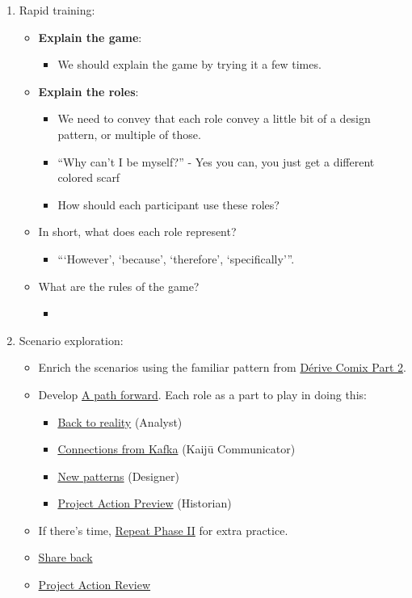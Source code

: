 \documentclass{article}
\begin{document}
\begin{enumerate}
\item Rapid training:

\begin{itemize}
\item \textbf{Explain the game}:
\begin{itemize}
\item We should explain the game by trying it a few times.
\end{itemize}
\item \textbf{Explain the roles}:
\begin{itemize}
\item We need to convey that each role convey a little bit of a design pattern, or multiple of those.
\item “Why can’t I be myself?” - Yes you can, you just get a different colored scarf
\item How should each participant use these roles?
\end{itemize}
\item In short, what does each role represent?
\begin{itemize}
\item ``‘However’, ‘because’, ‘therefore’, ‘specifically’''.
\end{itemize}
\item What are the rules of the game?
\begin{itemize}
\item{}
\end{itemize}
\end{itemize}

\item Scenario exploration:

\begin{itemize}
\item Enrich the scenarios using the familiar pattern from \hyperref[f447153f-7ff5-449d-bb08-67f579dda53f]{Dérive Comix Part 2}.
\item Develop \hyperref[7c0dce3b-d5ea-4712-a771-6ff26f143686]{A path forward}.  Each role as a part to play in doing this:
\begin{itemize}
\item \hyperref[e38d2006-bcf7-494b-bd51-d8932b1ed0cd]{Back to reality} (Analyst)
\item \hyperref[34be214c-5885-4794-b93c-84e49ddad18b]{Connections from Kafka} (Kaijū Communicator)
\item \hyperref[ed238393-a7e4-4a0d-9eb2-3d6ab745c170]{New patterns} (Designer)
\item \hyperref[baa168fb-37a0-4144-ab16-d4962728ea9c]{Project Action Preview} (Historian)
\end{itemize}
\item If there's time, \hyperref[092e4fe4-ee4f-494d-8776-c5f1389e8dc0]{Repeat Phase II} for extra practice.
\item \hyperref[848c8c3d-cde3-48b4-9dae-23eca4db440d]{Share back}
\item \hyperref[f5a1bc15-5abb-44d6-8f7a-e254974c9002]{Project Action Review}
\end{itemize}
\end{enumerate}
\end{document}
